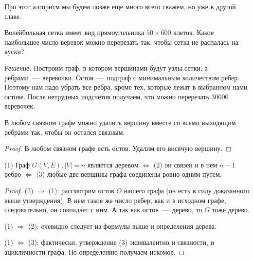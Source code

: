 	Про этот алгоритм мы будем позже еще много всего скажем, но уже в другой главе.

\begin{example}
	Волейбольная сетка имеет вид прямоугольника $50 \times 600$ клеток. Какое наибольшее число веревок можно перерезать так, чтобы сетка не распалась на куски?
	
	\emph{Решение.} Построим граф, в котором вершинами будут узлы сетки, а ребрами~---~веревочки. Остов~---~подграф с минимальным количеством ребер. Поэтому нам надо убрать все ребра, кроме тех, которые лежат в выбранном нами остове. После нетрудных подсчетов получаем, что можно перерезать $30000$ веревочек.
\end{example}

\begin{statement}
	В любом связном графе можно удалить вершину вместе со всеми выходящим ребрами так, чтобы он остался связным.
	
\begin{proof}
	В любом связном графе есть остов. Удалим его висячую вершину.
\end{proof}
\end{statement}	

\begin{statement}
	(1) Граф $G(V, E), |V| = n$ является деревом $\Leftrightarrow$ (2) он связен и в нем $n-1$ ребро $\Leftrightarrow$ (3) любые две вершины графа соединены ровно одним путем.
	
\begin{proof}
	(2) $\Rightarrow$ (1): рассмотрим остов $O$ нашего графа (он есть в силу доказанного выше утверждения). В нем такое же число ребер, как и в исходном графе, следовательно, он совпадает с ним. А так как остов~---~дерево, то $G$ тоже дерево.
	
	(1) $\Rightarrow$ (2): очевидно следует из формулы выше и определения дерева.
	
	(1) $\Leftrightarrow$ (3): фактически, утверждение (3) эквивалентно и связности, и ацикличности графа. По определению получаем искомое.
\end{proof}
\end{statement}



